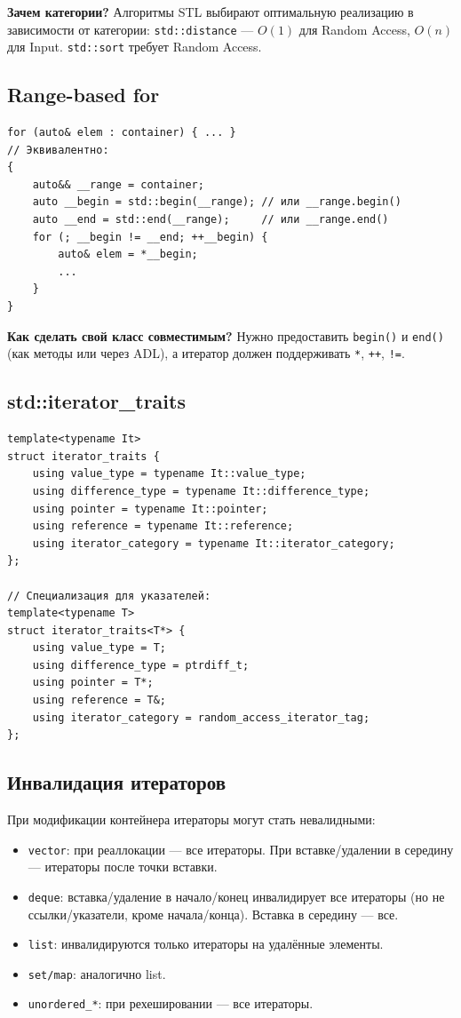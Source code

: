 \documentclass[12pt,a4paper]{article}
\begin{document}
\textbf{Зачем категории?} Алгоритмы STL выбирают оптимальную реализацию в зависимости от категории: \texttt{std::distance} --- $O(1)$ для Random Access, $O(n)$ для Input. \texttt{std::sort} требует Random Access.

\subsection{Range-based for}

\begin{lstlisting}
for (auto& elem : container) { ... }
// Эквивалентно:
{
    auto&& __range = container;
    auto __begin = std::begin(__range); // или __range.begin()
    auto __end = std::end(__range);     // или __range.end()
    for (; __begin != __end; ++__begin) {
        auto& elem = *__begin;
        ...
    }
}
\end{lstlisting}

\textbf{Как сделать свой класс совместимым?} Нужно предоставить \texttt{begin()} и \texttt{end()} (как методы или через ADL), а итератор должен поддерживать \texttt{*}, \texttt{++}, \texttt{!=}.

\subsection{std::iterator\_traits}

\begin{lstlisting}
template<typename It>
struct iterator_traits {
    using value_type = typename It::value_type;
    using difference_type = typename It::difference_type;
    using pointer = typename It::pointer;
    using reference = typename It::reference;
    using iterator_category = typename It::iterator_category;
};

// Специализация для указателей:
template<typename T>
struct iterator_traits<T*> {
    using value_type = T;
    using difference_type = ptrdiff_t;
    using pointer = T*;
    using reference = T&;
    using iterator_category = random_access_iterator_tag;
};
\end{lstlisting}

\subsection{Инвалидация итераторов}

При модификации контейнера итераторы могут стать невалидными:
\begin{itemize}
    \item \texttt{vector}: при реаллокации --- все итераторы. При вставке/удалении в середину --- итераторы после точки вставки.
    \item \texttt{deque}: вставка/удаление в начало/конец инвалидирует все итераторы (но не ссылки/указатели, кроме начала/конца). Вставка в середину --- все.
    \item \texttt{list}: инвалидируются только итераторы на удалённые элементы.
    \item \texttt{set/map}: аналогично list.
    \item \texttt{unordered\_*}: при рехешировании --- все итераторы.
\end{itemize}
\end{document}
